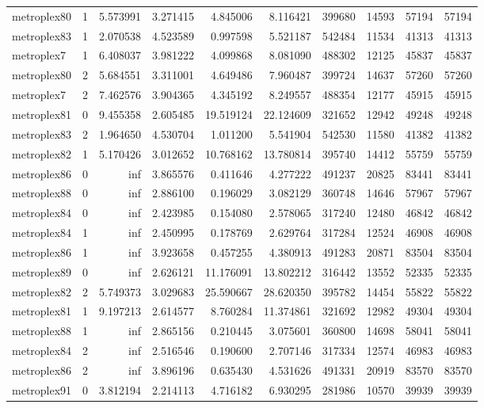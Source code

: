 \begin{longtable}{|l|r|r|r|r|r|r|r|r|r|}
metroplex80 & 1 & 5.573991 & 3.271415 & 4.845006 & 8.116421 & 399680 & 14593 & 57194 & 57194 \\
metroplex83 & 1 & 2.070538 & 4.523589 & 0.997598 & 5.521187 & 542484 & 11534 & 41313 & 41313 \\
metroplex7 & 1 & 6.408037 & 3.981222 & 4.099868 & 8.081090 & 488302 & 12125 & 45837 & 45837 \\
metroplex80 & 2 & 5.684551 & 3.311001 & 4.649486 & 7.960487 & 399724 & 14637 & 57260 & 57260 \\
metroplex7 & 2 & 7.462576 & 3.904365 & 4.345192 & 8.249557 & 488354 & 12177 & 45915 & 45915 \\
metroplex81 & 0 & 9.455358 & 2.605485 & 19.519124 & 22.124609 & 321652 & 12942 & 49248 & 49248 \\
metroplex83 & 2 & 1.964650 & 4.530704 & 1.011200 & 5.541904 & 542530 & 11580 & 41382 & 41382 \\
metroplex82 & 1 & 5.170426 & 3.012652 & 10.768162 & 13.780814 & 395740 & 14412 & 55759 & 55759 \\
metroplex86 & 0 & inf & 3.865576 & 0.411646 & 4.277222 & 491237 & 20825 & 83441 & 83441 \\
metroplex88 & 0 & inf & 2.886100 & 0.196029 & 3.082129 & 360748 & 14646 & 57967 & 57967 \\
metroplex84 & 0 & inf & 2.423985 & 0.154080 & 2.578065 & 317240 & 12480 & 46842 & 46842 \\
metroplex84 & 1 & inf & 2.450995 & 0.178769 & 2.629764 & 317284 & 12524 & 46908 & 46908 \\
metroplex86 & 1 & inf & 3.923658 & 0.457255 & 4.380913 & 491283 & 20871 & 83504 & 83504 \\
metroplex89 & 0 & inf & 2.626121 & 11.176091 & 13.802212 & 316442 & 13552 & 52335 & 52335 \\
metroplex82 & 2 & 5.749373 & 3.029683 & 25.590667 & 28.620350 & 395782 & 14454 & 55822 & 55822 \\
metroplex81 & 1 & 9.197213 & 2.614577 & 8.760284 & 11.374861 & 321692 & 12982 & 49304 & 49304 \\
metroplex88 & 1 & inf & 2.865156 & 0.210445 & 3.075601 & 360800 & 14698 & 58041 & 58041 \\
metroplex84 & 2 & inf & 2.516546 & 0.190600 & 2.707146 & 317334 & 12574 & 46983 & 46983 \\
metroplex86 & 2 & inf & 3.896196 & 0.635430 & 4.531626 & 491331 & 20919 & 83570 & 83570 \\
metroplex91 & 0 & 3.812194 & 2.214113 & 4.716182 & 6.930295 & 281986 & 10570 & 39939 & 39939 \\

\end{longtable}
